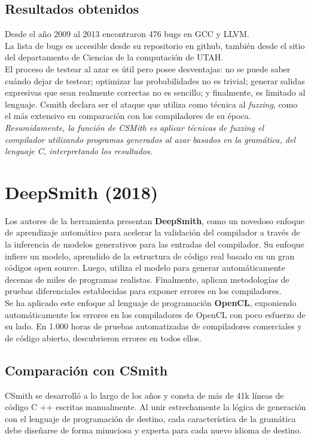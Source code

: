 \subsection{Resultados obtenidos}
Desde el año 2009 al 2013 encontraron 476 bugs en GCC\cite{gccbuglistcsmith} y LLVM\cite{llvmbuglistcsmith}.\\

La lista de bugs es accesible desde su repositorio\cite{bugsreportedcsmith} en github, también desde el sitio del departamento de Ciencias de la computación de UTAH.\\

El proceso de testear al azar es útil pero posee desventajas: no se puede saber cuándo dejar de testear; optimizar las probabilidades no es trivial; generar salidas expresivas que sean realmente correctas no es sencillo; y finalmente, es limitado al lenguaje. Csmith declara ser el ataque que utiliza como técnica al \textit{fuzzing}, como el más extensivo en comparación con los compiladores de su época.\\

\textit{Resumidamente, la función de CSMith es aplicar técnicas de fuzzing el compilador utilizando programas generados al azar basados en la gramática, del lenguaje C, interpretando los resultados.}

\section{DeepSmith (2018)}
Los autores de la herramienta presentan \textbf{DeepSmith}\cite{Cummins:2018:CFT:3213846.3213848}, como un novedoso enfoque de aprendizaje automático para acelerar la validación del compilador a través de la inferencia de modelos generativos para las entradas del compilador. Su enfoque infiere un modelo, aprendido de la estructura de código real basado en un gran códigos open source. Luego, utiliza el modelo para generar automáticamente decenas de miles de programas realistas. Finalmente, aplican metodologías de pruebas diferenciales establecidas para exponer errores en los compiladores.\\

Se ha aplicado este enfoque al lenguaje de programación \textbf{OpenCL}, exponiendo automáticamente los errores en los compiladores de OpenCL con poco esfuerzo de su lado. En 1.000 horas de pruebas automatizadas de compiladores comerciales y de código abierto, descubrieron errores en todos ellos.

\subsection{Comparación con CSmith}
CSmith se desarrolló a lo largo de los años y consta de más de 41k líneas de código C ++ escritas manualmente. Al unir estrechamente la lógica de generación con el lenguaje de programación de destino, cada característica de la gramática debe diseñarse de forma minuciosa y experta para cada nuevo idioma de destino.\\

